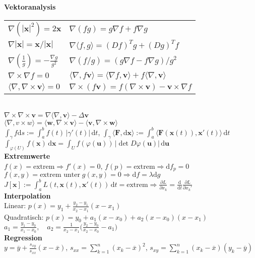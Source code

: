 \documentclass[a4paper,10pt,fleqn,twoside,twocolumn,dvipdfmx]{scrartcl}
\newcommand{\strong}[1]{\textsf{\textbf{#1}}}
\newcommand{\ds}{\displaystyle}
\newcommand{\bvec}[1]{\mathbf{#1}}
\begin{document}
\strong{Vektoranalysis}\\[2pt]
\begin{tabular}{@{}l|l}
$\nabla(|\mathbf x|^2) = 2\mathbf x$ & $\nabla (fg) = g\nabla f+f\nabla g$\\
$\nabla |\mathbf x| = \mathbf x/|\mathbf x|$ & $\nabla\langle f,g\rangle = (Df)^T g+(Dg)^T f$\\
$\nabla (\tfrac{1}{g}) = -\frac{\nabla g}{g^2}$
& $\nabla(f/g) = (g\nabla f-f\nabla g)/g^2$\\
$\nabla\times\nabla f = 0$
& $\langle\nabla,f\bvec v\rangle
= \langle\nabla f,\bvec v\rangle + f\langle\nabla,\bvec v\rangle$\\
$\langle\nabla,\nabla\times\bvec v\rangle = 0$
& $\nabla\times(f\bvec v)
= f(\nabla\times\bvec v) - \bvec v\times \nabla f$
\end{tabular}\\
$\nabla\times\nabla\times\bvec v
= \nabla\langle\nabla,\bvec v\rangle-\Delta\bvec v$\\
$\langle\nabla,v\times w\rangle
= \langle\bvec w,\nabla\times\bvec v\rangle
- \langle\bvec v,\nabla\times\bvec w\rangle$\\
$\int_\gamma f\mathrm ds := \!\int_a^b\! f(t)\,|\gamma'(t)|\,\mathrm dt$,\;
$\int_\gamma\!\langle\bvec F,\mathrm d\bvec x\rangle
:= \!\int_a^b\! \langle\bvec F(\bvec x(t)),\bvec x'(t)\rangle\,\mathrm dt$\\
$\int_{\varphi(U)} f(\bvec x)\,\mathrm d\bvec x
= \int_U f(\varphi(\bvec u))\,|{\det D\varphi(\bvec u)}|\,
\mathrm d\bvec u$\\[4pt]
\strong{Extremwerte}\\[2pt]
$f(x)=\text{extrem} \Rightarrow f'(x)=0$,\; $f(p)=\text{extrem} \Rightarrow \mathrm df_p=0$\\
$f(x,y)=\text{extrem unter}\;g(x,y)=0 \Rightarrow \mathrm df = \lambda\mathrm dg$\\
$\ds J[\bvec x] := {\textstyle\int_a^b} L(t,\bvec x(t),\bvec x'(t))\,\mathrm dt
= \text{extrem}
\Rightarrow\frac{\partial L}{\partial x_k}
= \frac{\mathrm d}{\mathrm dt}\frac{\partial L}{\partial x_k'}$\\
\strong{Interpolation}\\
Linear: $\ds p(x) = y_1+\frac{y_2-y_1}{x_2-x_1}(x-x_1)$\\
Quadratisch: $p(x) = y_0+a_1(x-x_0)+a_2(x-x_0)(x-x_1)$\\
$\ds a_1 = \frac{y_1-y_0}{x_1-x_0},\quad
a_2 = \frac{1}{x_2-x_1}
\Big(\frac{y_2-y_0}{x_2-x_0}-a_1\Big)$\\[4pt]
\strong{Regression}\\[2pt]
$\ds y = \overline y + \frac{s_{xy}}{s_{xx}}(x{-}\overline x)$,\;
$s_{xx} \!= \!\sum\limits_{k=1}^n (x_k{-}\overline x)^2$,\;
$s_{xy} \!= \!\sum\limits_{k=1}^n (x_k{-}\overline x)(y_k{-}\overline y)$
\end{document}
